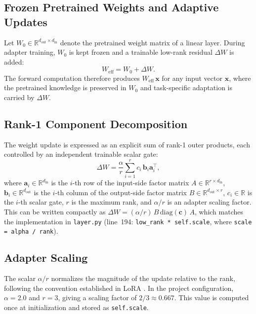 \documentclass[conference]{IEEEtran}
\begin{document}
\subsection{Frozen Pretrained Weights and Adaptive Updates}
Let $W_0 \in \mathbb{R}^{d_{\text{out}} \times d_{\text{in}}}$
denote the pretrained weight matrix of a linear layer. During
adapter training, $W_0$ is kept frozen and a trainable low-rank
residual $\Delta W$ is added:
\begin{equation}
  W_{\text{eff}} = W_0 + \Delta W.
  \label{eq:eff_weight}
\end{equation}
The forward computation therefore produces
$W_{\text{eff}}\,\mathbf{x}$ for any input vector
$\mathbf{x}$, where the pretrained knowledge is preserved in
$W_0$ and task-specific adaptation is carried by $\Delta W$.

\subsection{Rank-1 Component Decomposition}
The weight update is expressed as an explicit sum of
rank-1 outer products, each controlled by an independent
trainable scalar gate:
\begin{equation}
  \Delta W
    = \frac{\alpha}{r}\sum_{i=1}^{r} c_i\,
      \mathbf{b}_i \mathbf{a}_i^{\top},
  \label{eq:decomp}
\end{equation}
where $\mathbf{a}_i \in \mathbb{R}^{d_{\text{in}}}$ is the
$i$-th row of the input-side factor matrix
$A \in \mathbb{R}^{r \times d_{\text{in}}}$,
$\mathbf{b}_i \in \mathbb{R}^{d_{\text{out}}}$ is the $i$-th
column of the output-side factor matrix
$B \in \mathbb{R}^{d_{\text{out}} \times r}$,
$c_i \in \mathbb{R}$ is the $i$-th scalar gate, $r$ is the
maximum rank, and $\alpha / r$ is an adapter scaling factor.
This can be written compactly as
$\Delta W = (\alpha/r)\,B\,\mathrm{diag}(\mathbf{c})\,A$,
which matches the implementation in \texttt{layer.py}
(line~194: \texttt{low\_rank * self.scale}, where
\texttt{scale = alpha / rank}).

\subsection{Adapter Scaling}
The scalar $\alpha / r$ normalizes the magnitude of the update
relative to the rank, following the convention established in
LoRA \cite{hu2022lora}. In the project configuration,
$\alpha = 2.0$ and $r = 3$, giving a scaling factor of
$2/3 \approx 0.667$. This value is computed once at
initialization and stored as \texttt{self.scale}.
\end{document}
